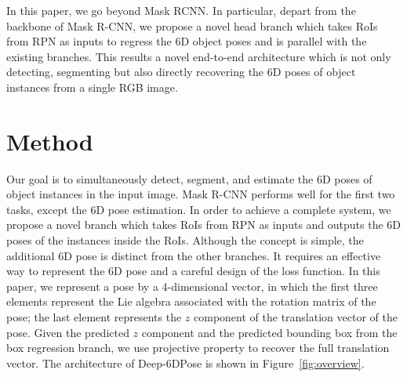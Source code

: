 \documentclass[conference]{IEEEtran}
\newcommand{\method}[1]{Deep-6DPose}
\begin{document}
In this paper, we go beyond Mask RCNN. In particular, depart from the backbone of Mask R-CNN, we propose a novel head branch which takes RoIs from RPN as inputs to regress the 6D object poses and is parallel with the existing branches. This results a novel end-to-end architecture which is not only detecting, segmenting but also directly recovering the 6D poses of object instances from a single RGB image. 


\section{Method}\label{sec:method}%
Our goal is to simultaneously detect, segment, and estimate the 6D poses of object instances in the input image. 
Mask R-CNN performs well for the first two tasks, except the 6D pose estimation. In order to achieve a complete system, we propose a novel branch which takes RoIs from RPN as inputs and outputs the 6D poses of the instances inside the RoIs. %
Although the concept is simple, the additional 6D pose is distinct from the other branches. It requires an effective way to represent the 6D pose and a careful design of the loss function. 
In this paper, we represent a pose by a 4-dimensional vector, in which the first three elements represent the Lie algebra associated with the rotation matrix of the pose; the last element represents the $z$ component of the translation vector of the pose. Given the predicted $z$ component and the predicted bounding box from the box regression branch, we use projective property to recover the full translation vector. The architecture of \method{} is shown in Figure~\ref{fig:overview}.
\end{document}
